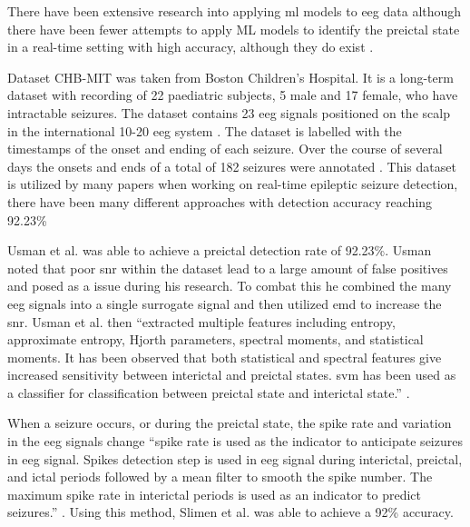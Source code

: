 \documentclass[12pt]{article}
\begin{document}
There have been extensive research into applying \acrshort{ml} models to \acrshort{eeg} data \cite{shoeb2010application} \cite{chakraborti2018machine}\cite{kumar2014machine} \cite{shen2022eeg} \cite{gupta2019epileptic} \cite{samiee2015long} \cite{zabihi2015analysis} \cite{wang2021one} \cite{zarei2021automatic} \cite{li2021seizure} \cite{shoeb2009application} \cite{wong2023eeg} although there have been fewer attempts to apply ML models to identify the preictal state in a real-time setting with high accuracy, although they do exist \cite{usman2017epileptic}. 

Dataset CHB-MIT \cite{shoeb2009application} \cite{PhysioNet} was taken from Boston Children's Hospital. It is a long-term dataset with recording of 22 paediatric subjects, 5 male and 17 female, who have intractable seizures. The dataset contains 23 \acrshort{eeg} signals positioned on the scalp in the international 10-20 \acrshort{eeg} system \cite{sharbrough1991american}. The dataset is labelled with the timestamps of the onset and ending of each seizure. Over the course of several days the onsets and ends of a total of 182 seizures were annotated \cite{shoeb2009application} \cite{PhysioNet}. This dataset is utilized by many papers when working on real-time epileptic seizure detection, there have been many different approaches with detection accuracy reaching 92.23\% \cite{usman2017epileptic}

Usman et al. was able to achieve a preictal detection rate of 92.23\%. \cite{usman2017epileptic} Usman noted that poor \acrfull{snr} within the dataset lead to a large amount of false positives and posed as a issue during his research. To combat this he combined the many \acrshort{eeg} signals into a single surrogate signal and then utilized \acrfull{emd} to increase the \acrshort{snr}. Usman et al. then ``extracted multiple features including entropy, approximate entropy, Hjorth parameters, spectral moments, and statistical moments. It has been observed that both statistical and spectral features give increased sensitivity between interictal and preictal states. \acrfull{svm} \cite{hearst1998support} has been used as a classifier for classification between preictal state and interictal state.'' \cite{usman2017epileptic}.

When a seizure occurs, or during the preictal state, the spike rate and variation in the \acrshort{eeg} signals change \cite{lange1983temporo} \cite{truccolo2011single} ``spike rate is used as the indicator to anticipate seizures in \acrfull{eeg} signal. Spikes detection step is used in \acrshort{eeg} signal during interictal, preictal, and ictal periods followed by a mean filter to smooth the spike number. The maximum spike rate in interictal periods is used as an indicator to predict seizures.'' \cite{slimen2020epileptic}. Using this method, Slimen et al. was able to achieve a 92\% accuracy.
\end{document}
